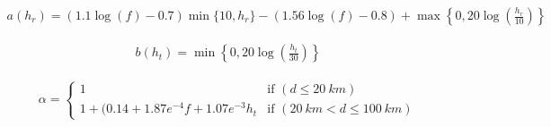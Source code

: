 \begin{align} 
\label{eqn:COSTModelExtendedhr}
a(h_r)=(1.1\log(f)-0.7) \min\{10,h_r\}-(1.56\log(f)-0.8)+\max\left\{0,20\log\left(\frac{h_r}{10}\right)\right\}
\end{align} 

\begin{align} 
\label{eqn:COSTModelExtendedht}
b(h_t)= \min\left\{0,20\log\left(\frac{h_t}{30}\right)\right\}
\end{align} 

\begin{align} 
\label{eqn:aplhacostextended}
\alpha = 
  \begin{cases}
      1 & \text{if } (d \leq \SI{20}{km}) \\
    1+(0.14+1.87e^{-4} f + 1.07e^{-3} h_t & \text{if } (\SI{20}{km} < d \leq \SI{100}{km})
  \end{cases}
\end{align} 